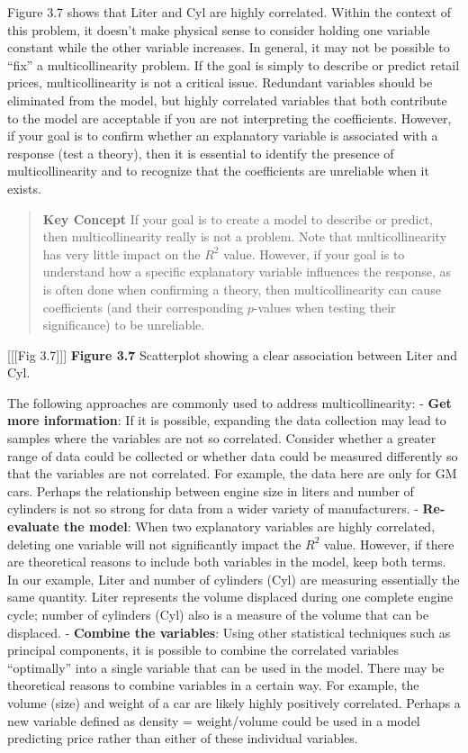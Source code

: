 \documentclass[
]{report}
\theoremstyle{definition}
\theoremstyle{definition}
\theoremstyle{definition}
\theoremstyle{definition}
\theoremstyle{remark}
\begin{document}
Figure 3.7 shows that Liter and Cyl are highly correlated. Within the context of this problem, it doesn't make physical sense to consider holding one variable constant while the other variable increases. In general, it may not be possible to ``fix'' a multicollinearity problem. If the goal is simply to describe or predict retail prices, multicollinearity is not a critical issue. Redundant variables should be eliminated from the model, but highly correlated variables that both contribute to the model are acceptable if you are not interpreting the coefficients. However, if your goal is to confirm whether an explanatory variable is associated with a response (test a theory), then it is essential to identify the presence of multicollinearity and to recognize that the coefficients are unreliable when it exists.

\begin{quote}
\textbf{Key Concept}
If your goal is to create a model to describe or predict, then multicollinearity really is not a problem. Note that multicollinearity has very little impact on the \(R^2\) value. However, if your goal is to understand how a specific explanatory variable influences the response, as is often done when confirming a theory, then multicollinearity can cause coefficients (and their corresponding \(p\)-values when testing their significance) to be unreliable.
\end{quote}

{[}{[}{[}Fig 3.7{]}{]}{]}
\textbf{Figure 3.7} Scatterplot showing a clear association between Liter and Cyl.

The following approaches are commonly used to address multicollinearity:
- \textbf{Get more information}: If it is possible, expanding the data collection may lead to samples where the variables are not so correlated. Consider whether a greater range of data could be collected or whether data could be measured differently so that the variables are not correlated. For example, the data here are only for GM cars. Perhaps the relationship between engine size in liters and number of cylinders is not so strong for data from a wider variety of manufacturers.
- \textbf{Re-evaluate the model}: When two explanatory variables are highly correlated, deleting one variable will not significantly impact the \(R^2\) value. However, if there are theoretical reasons to include both variables in the model, keep both terms. In our example, Liter and number of cylinders (Cyl) are measuring essentially the same quantity. Liter represents the volume displaced during one complete engine cycle; number of cylinders (Cyl) also is a measure of the volume that can be displaced.
- \textbf{Combine the variables}: Using other statistical techniques such as principal components, it is possible to combine the correlated variables ``optimally'' into a single variable that can be used in the model. There may be theoretical reasons to combine variables in a certain way. For example, the volume (size) and weight of a car are likely highly positively correlated. Perhaps a new variable defined as density = weight/volume could be used in a model predicting price rather than either of these individual variables.
\end{document}
